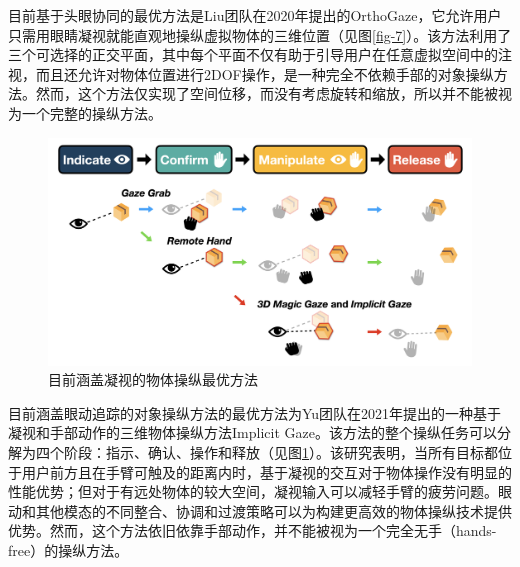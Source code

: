 目前基于头眼协同的最优方法是Liu团队在2020年提出的OrthoGaze，它允许用户只需用眼睛凝视就能直观地操纵虚拟物体的三维位置（见图\ref{fig-7}）。该方法利用了三个可选择的正交平面，其中每个平面不仅有助于引导用户在任意虚拟空间中的注视，而且还允许对物体位置进行2DOF操作，是一种完全不依赖手部的对象操纵方法。然而，这个方法仅实现了空间位移，而没有考虑旋转和缩放，所以并不能被视为一个完整的操纵方法。

\begin{figure}[t!]
    \centering
    \includegraphics[width=.7\textwidth]{figure/gaze_supported_sota.png}
    \caption{目前涵盖凝视的物体操纵最优方法}
    \label{fig-8}
\end{figure}

目前涵盖眼动追踪的对象操纵方法的最优方法为Yu团队在2021年提出的一种基于凝视和手部动作的三维物体操纵方法Implicit Gaze。该方法的整个操纵任务可以分解为四个阶段：指示、确认、操作和释放（见图\ref{fig-8}）。该研究表明，当所有目标都位于用户前方且在手臂可触及的距离内时，基于凝视的交互对于物体操作没有明显的性能优势；但对于有远处物体的较大空间，凝视输入可以减轻手臂的疲劳问题。眼动和其他模态的不同整合、协调和过渡策略可以为构建更高效的物体操纵技术提供优势。然而，这个方法依旧依靠手部动作，并不能被视为一个完全无手（hands-free）的操纵方法。
